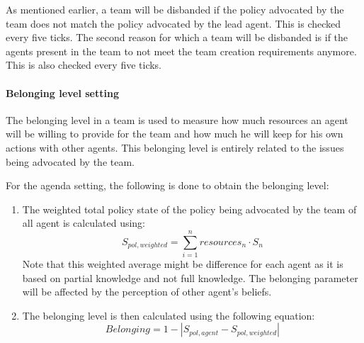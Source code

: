As mentioned earlier, a team will be disbanded if the policy advocated by the team does not match the policy advocated by the lead agent. This is checked every five ticks. The second reason for which a team will be disbanded is if the agents present in the team to not meet the team creation requirements anymore. This is also checked every five ticks.

%

\paragraph{Belonging level setting}

The belonging level in a team is used to measure how much resources an agent will be willing to provide for the team and how much he will keep for his own actions with other agents. This belonging level is entirely related to the issues being advocated by the team.

For the agenda setting, the following is done to obtain the belonging level:

\begin{enumerate}
\item The weighted total policy state of the policy being advocated by the team of all agent is calculated using:
	\begin{equation}
	S_{pol, weighted} = \sum_{i=1}^n resources_n \cdot S_n
	\end{equation}
	Note that this weighted average might be difference for each agent as it is based on partial knowledge and not full knowledge. The belonging parameter will be affected by the perception of other agent's beliefs.
\item The belonging level is then calculated using the following equation:
	\begin{equation}
	Belonging = 1 - \left| S_{pol,agent} - S_{pol,weighted} \right|
	\end{equation}
\end{enumerate}

